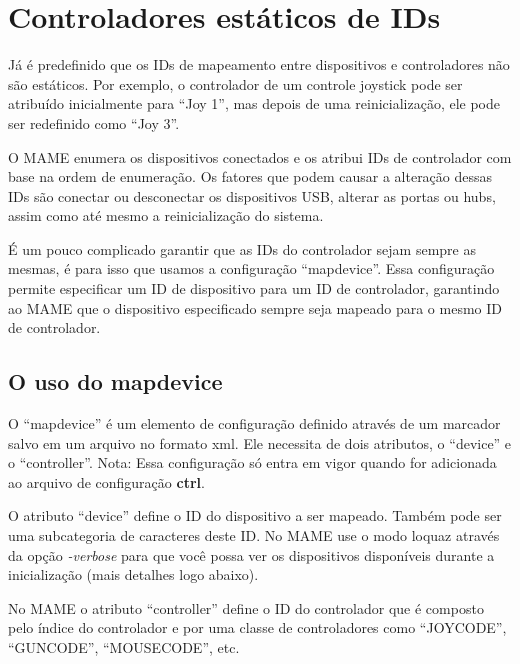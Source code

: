 \documentclass[letterpaper,10pt,brazil]{sphinxmanual}
\begin{document}
\section{Controladores estáticos de IDs}
\label{advanced/devicemap:controladores-estaticos-de-ids}\label{advanced/devicemap::doc}
Já é predefinido que os IDs de mapeamento entre dispositivos e
controladores não são estáticos. Por exemplo, o controlador de um
controle joystick pode ser atribuído inicialmente para ``Joy 1'', mas
depois de uma reinicialização, ele pode ser redefinido como ``Joy 3''.

O MAME enumera os dispositivos conectados e os atribui IDs de
controlador com base na ordem de enumeração. Os fatores que podem causar
a alteração dessas IDs são conectar ou desconectar os dispositivos USB,
alterar as portas ou hubs, assim como até mesmo a reinicialização do
sistema.

É um pouco complicado garantir que as IDs do controlador sejam sempre as
mesmas, é para isso que usamos a configuração ``mapdevice''.
Essa configuração permite especificar um ID de dispositivo para um ID de
controlador, garantindo ao MAME que o dispositivo especificado sempre seja
mapeado para o mesmo ID de controlador.
\clearpage

\subsection{O uso do mapdevice}
\label{advanced/devicemap:o-uso-do-mapdevice}
O ``mapdevice'' é um elemento de configuração definido através de um
marcador salvo em um arquivo no formato xml. Ele necessita de dois
atributos, o ``device'' e o ``controller''.
Nota: Essa configuração só entra em vigor quando for adicionada ao
arquivo de configuração \textbf{ctrl}.

O atributo ``device'' define o ID do dispositivo a ser mapeado. Também
pode ser uma subcategoria de caracteres deste ID. No MAME use o modo
loquaz através da opção \emph{-verbose} para que você possa ver os
dispositivos disponíveis durante a inicialização (mais detalhes logo
abaixo).

No MAME o atributo ``controller'' define o ID do controlador que é
composto pelo índice do controlador e por uma classe de controladores
como ``JOYCODE'', ``GUNCODE'', ``MOUSECODE'', etc.
\end{document}
